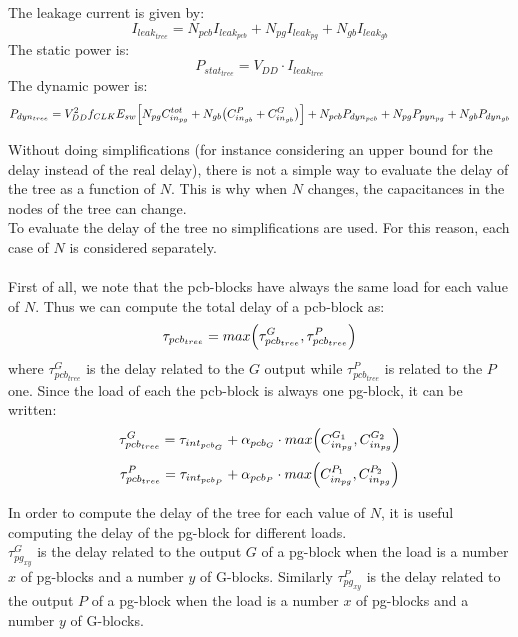 The leakage current is given by:
\begin{equation}
I_{leak_{tree}}=N_{pcb}I_{leak_{pcb}}+N_{pg}I_{leak_{pg}}+N_{gb}I_{leak_{gb}}
\end{equation}
The static power is:
\begin{equation}
P_{stat_{tree}}=V_{DD}\cdot I_{leak_{tree}}
\end{equation}
The dynamic power is:
\begin{equation}
P_{dyn_{tree}} = V_{DD}^2 f_{CLK} E_{sw} \Bigl[N_{pg}C_{in_{pg}}^{tot} + N_{gb}\bigl( C_{in_{gb}}^{P}+ C_{in_{gb}}^{G} \bigr)\Bigr] + N_{pcb} P_{dyn_{pcb}} + N_{pg} P_{pyn_{pg}} + N_{gb} P_{dyn_{gb}}
\end{equation}

Without doing simplifications (for instance considering an upper bound for the delay instead of the real delay), there is not a simple way to evaluate the delay of the tree as a function of $N$. This is why when $N$ changes, the capacitances in the nodes of the tree can change.\\
To evaluate the delay of the tree no simplifications are used. For this reason, each case of $N$ is considered separately.\\\\
First of all, we note that the pcb-blocks have always the same load for each value of $N$. Thus we can compute the total delay of a pcb-block as:
\begin{equation}
\tau_{pcb_{tree}} = max\Bigl(\tau_{pcb_{tree}}^G, \tau_{pcb_{tree}}^P\Bigr)
\end{equation}
where $\tau_{pcb_{tree}}^G$ is the delay related to the $G$ output while $\tau_{pcb_{tree}}^P$ is related to the $P$ one. Since the load of each the pcb-block is always one pg-block, it can be written:
\begin{equation}
\tau_{pcb_{tree}}^G = \tau_{int_{pcb_{G}}} +  \alpha_{pcb_{G}} \cdot max\Bigl(C_{in_{pg}}^{G_1}, C_{in_{pg}}^{G_2} \Bigr)
\end{equation}
\begin{equation}
\tau_{pcb_{tree}}^P = \tau_{int_{pcb_{P}}} +  \alpha_{pcb_{P}} \cdot max\Bigl(C_{in_{pg}}^{P_1}, C_{in_{pg}}^{P_2} \Bigr)
\end{equation}

In order to compute the delay of the tree for each value of $N$, it is useful computing the delay of the pg-block for different loads. \\
$\tau_{pg_{xy}}^G$ is the delay related to the output $G$ of a pg-block  when the load is a number $x$ of pg-blocks and a number $y$ of G-blocks. Similarly $\tau_{pg_{xy}}^P$ is the delay related to the output $P$ of a pg-block  when the load is a number $x$ of pg-blocks and a number $y$ of G-blocks.\\

